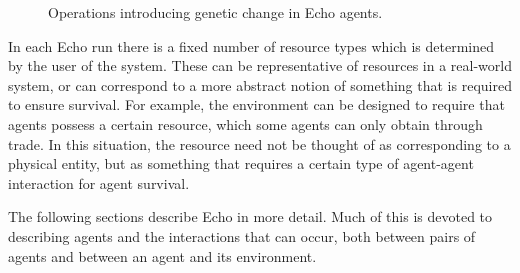 \begin{figure}[htbp]
\begin{center}
\leavevmode
{}
\caption{Operations introducing genetic change in Echo agents.
\label{fig:agent-evolution}}
\end{center}
\end{figure}

In each Echo run there is a fixed number of resource types which is
determined by the user of the system. These can be representative of
resources in a real-world system, or can correspond to a more abstract
notion of something that is required to ensure survival.  For example,
the environment can be designed to require that agents possess a
certain resource, which some agents can only obtain through trade. In
this situation, the resource need not be thought of as corresponding
to a physical entity, but as something that requires a certain type of
agent-agent interaction for agent survival. 

The following sections describe Echo in more detail. Much of this is
devoted to describing agents and the interactions that can occur, both
between pairs of agents and between an agent and its environment.

